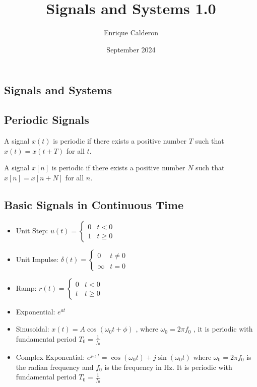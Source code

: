 \documentclass[letterpaper]{article}
\title{Signals and Systems 1.0}
\author{Enrique Calderon}
\date{September 2024}
\newcommand{\divline}{\noindent\makebox[\linewidth]{\rule{\textwidth}{0.4pt}}}
\begin{document}
    \maketitle

    \divline
    \begin{multicols}{2}
        \section{Signals and Systems}

        \subsection{Periodic Signals}

        A signal $x(t)$ is periodic if there exists a positive number $T$ such that $x(t) = x(t + T)$ for all $t$.

        A signal $x[n]$ is periodic if there exists a positive number $N$ such that $x[n] = x[n + N]$ for all $n$.

        \subsection{Basic Signals in Continuous Time}

        \begin{itemize}
            \item Unit Step: $u(t) = \begin{cases} 0 & t < 0 \\ 1 & t \geq 0 \end{cases}$
            \item Unit Impulse: $\delta(t) = \begin{cases} 0 & t \neq 0 \\ \infty & t = 0 \end{cases}$
            \item Ramp: $r(t) = \begin{cases} 0 & t < 0 \\ t & t \geq 0 \end{cases}$
            \item Exponential: $e^{at}$
            \item Sinusoidal: $x(t) = A \cos{(\omega_0 t + \phi)}$ , where $\omega_0 = 2\pi f_0$ , it is periodic with fundamental period $T_0 = \frac{1}{f_0}$
            \item Complex Exponential: $e^{j\omega_0 t} = \cos{(\omega_0 t)} + j\sin{(\omega_0 t)}$ where $\omega_0 = 2\pi f_0$ is the radian frequency and $f_0$ is the frequency in Hz. It is periodic with fundamental period $T_0 = \frac{1}{f_0}$
        \end{itemize}


\end{multicols}
\end{document}
